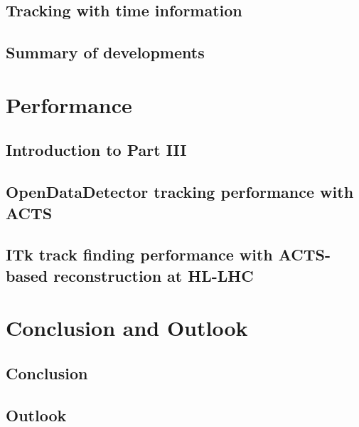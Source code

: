 \documentclass[12pt,a4paper,bibliography=totoc,BCOR=10mm]{scrreprt} %
\begin{document}
\chapter{Tracking with time information}
\label{ch:dev/4d_tracking}


\chapter{Summary of developments}
\label{ch:dev/summary}


\part{Performance}
\label{pt:performance}

\chapter*{Introduction to Part III}


\chapter{OpenDataDetector tracking performance with ACTS}
\label{ch:perf/odd}


\chapter{ITk track finding performance with ACTS-based reconstruction at HL-LHC}
\label{ch:perf/itk}


\part{Conclusion and Outlook}
\label{pt:conclusion_outlook}

\chapter{Conclusion}
\label{ch:conclusion}


\chapter{Outlook}
\label{ch:outlook}

\end{document}

